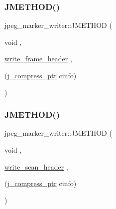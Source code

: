 \mbox{\label{structjpeg__marker__writer_a16553ec95a48ff5d49a1c698541eb859}} 
\subsubsection{\texorpdfstring{JMETHOD()}{JMETHOD()}\hspace{0.1cm}{\footnotesize\ttfamily [2/7]}}
{\footnotesize\ttfamily jpeg\+\_\+marker\+\_\+writer\+::\+J\+M\+E\+T\+H\+OD (\begin{DoxyParamCaption}\item[{void}]{,  }\item[{\mbox{\hyperlink{jcmarker_8c_a3ca174ee750f1f7a7d703f49cece9734}{write\+\_\+frame\+\_\+header}}}]{,  }\item[{(\mbox{\hyperlink{jpeglib_8h_add2a072c54e3a51550f4975f7ddb91e7}{j\+\_\+compress\+\_\+ptr}} cinfo)}]{ }\end{DoxyParamCaption})}

\mbox{\label{structjpeg__marker__writer_a696bbc698ad5760bbeb1614f9e6a7509}} 
\subsubsection{\texorpdfstring{JMETHOD()}{JMETHOD()}\hspace{0.1cm}{\footnotesize\ttfamily [3/7]}}
{\footnotesize\ttfamily jpeg\+\_\+marker\+\_\+writer\+::\+J\+M\+E\+T\+H\+OD (\begin{DoxyParamCaption}\item[{void}]{,  }\item[{\mbox{\hyperlink{jcmarker_8c_ade06dd93aedf31146a4833c22b7bd57b}{write\+\_\+scan\+\_\+header}}}]{,  }\item[{(\mbox{\hyperlink{jpeglib_8h_add2a072c54e3a51550f4975f7ddb91e7}{j\+\_\+compress\+\_\+ptr}} cinfo)}]{ }\end{DoxyParamCaption})}

\mbox{\label{structjpeg__marker__writer_affc544100d40a2c75c8e438569ea7844}} 
